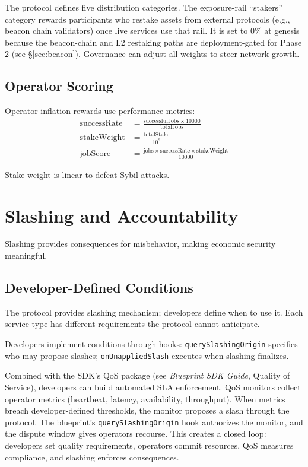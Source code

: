 \documentclass[11pt,a4paper]{article}
\begin{document}
The protocol defines five distribution categories. The exposure-rail ``stakers'' category rewards participants who restake assets from external protocols (e.g., beacon chain validators) once live services use that rail. It is set to 0\% at genesis because the beacon-chain and L2 restaking paths are deployment-gated for Phase 2 (see \S\ref{sec:beacon}). Governance can adjust all weights to steer network growth.

\subsection{Operator Scoring}

Operator inflation rewards use performance metrics:
\begin{align*}
\text{successRate} &= \frac{\text{successfulJobs} \times 10000}{\text{totalJobs}} \\
\text{stakeWeight} &= \frac{\text{totalStake}}{10^9} \\
\text{jobScore} &= \frac{\text{jobs} \times \text{successRate} \times \text{stakeWeight}}{10000}
\end{align*}

Stake weight is linear to defeat Sybil attacks.

\section{Slashing and Accountability}

Slashing provides consequences for misbehavior, making economic security meaningful.

\subsection{Developer-Defined Conditions}

The protocol provides slashing mechanism; developers define when to use it. Each service type has different requirements the protocol cannot anticipate.

Developers implement conditions through hooks: \texttt{querySlashingOrigin} specifies who may propose slashes; \texttt{onUnappliedSlash} executes when slashing finalizes.

Combined with the SDK's QoS package (see \textit{Blueprint SDK Guide}, Quality of Service), developers can build automated SLA enforcement. QoS monitors collect operator metrics (heartbeat, latency, availability, throughput). When metrics breach developer-defined thresholds, the monitor proposes a slash through the protocol. The blueprint's \texttt{querySlashingOrigin} hook authorizes the monitor, and the dispute window gives operators recourse. This creates a closed loop: developers set quality requirements, operators commit resources, QoS measures compliance, and slashing enforces consequences.
\end{document}
